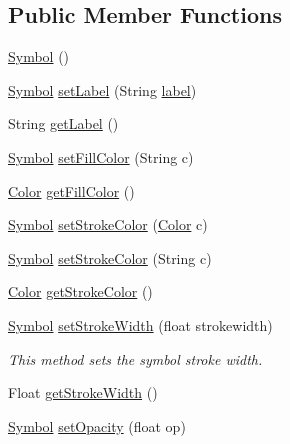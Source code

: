 \subsection*{Public Member Functions}
\begin{DoxyCompactItemize}
\item 
\hyperlink{classbridges_1_1base_1_1_symbol_a5449cffb7ffdbab093a110957158acc6}{Symbol} ()
\item 
\hyperlink{classbridges_1_1base_1_1_symbol}{Symbol} \hyperlink{classbridges_1_1base_1_1_symbol_a8b5aa729cfe2cc5baecf6ec0aa29ac34}{set\+Label} (String \hyperlink{classbridges_1_1base_1_1_symbol_ad2adcc82e6a96c2f3c465702502655e9}{label})
\item 
String \hyperlink{classbridges_1_1base_1_1_symbol_a7616c25b288a6e464f4f0b5fe4bd2826}{get\+Label} ()
\item 
\hyperlink{classbridges_1_1base_1_1_symbol}{Symbol} \hyperlink{classbridges_1_1base_1_1_symbol_a5d3faeffe2dbff7207a4f3d663a34763}{set\+Fill\+Color} (String c)
\item 
\hyperlink{classbridges_1_1base_1_1_color}{Color} \hyperlink{classbridges_1_1base_1_1_symbol_aed2e531266c8a3bc563709c6486380cc}{get\+Fill\+Color} ()
\item 
\hyperlink{classbridges_1_1base_1_1_symbol}{Symbol} \hyperlink{classbridges_1_1base_1_1_symbol_a10abfbf4651ffdc630121da84e23b116}{set\+Stroke\+Color} (\hyperlink{classbridges_1_1base_1_1_color}{Color} c)
\item 
\hyperlink{classbridges_1_1base_1_1_symbol}{Symbol} \hyperlink{classbridges_1_1base_1_1_symbol_ae9aa7d4e9b497875017a9b6e0eaab181}{set\+Stroke\+Color} (String c)
\item 
\hyperlink{classbridges_1_1base_1_1_color}{Color} \hyperlink{classbridges_1_1base_1_1_symbol_abd38aaea2fc344adcc8096ed6eb8681c}{get\+Stroke\+Color} ()
\item 
\hyperlink{classbridges_1_1base_1_1_symbol}{Symbol} \hyperlink{classbridges_1_1base_1_1_symbol_a4b1ce1fdbc8e76538e67a292e150083c}{set\+Stroke\+Width} (float strokewidth)
\begin{DoxyCompactList}\small\item\em This method sets the symbol stroke width. \end{DoxyCompactList}\item 
Float \hyperlink{classbridges_1_1base_1_1_symbol_aa9f4b8ed61cfd3a30dc979d53526ab4e}{get\+Stroke\+Width} ()
\item 
\hyperlink{classbridges_1_1base_1_1_symbol}{Symbol} \hyperlink{classbridges_1_1base_1_1_symbol_abac237b439448cbef3744817d14061c5}{set\+Opacity} (float op)

\end{DoxyCompactItemize}
